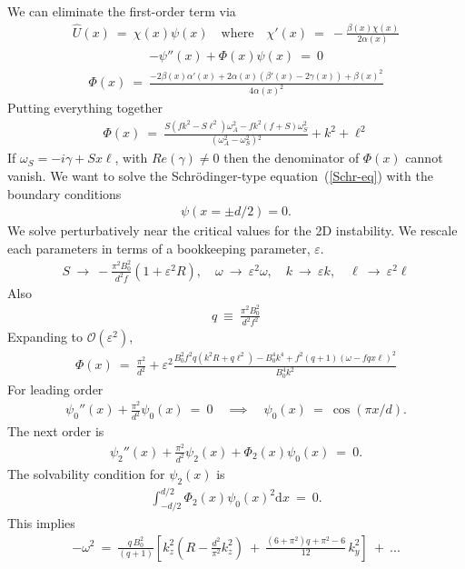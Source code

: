 \documentclass[aps,prl,preprint
,superscriptaddress]{revtex4-1}
\newcommand\Beq{\begin{eqnarray}}
\newcommand\Eeq{\end{eqnarray}}
\newcommand{\eps}{\varepsilon}
\begin{document}
We can eliminate the first-order term via
\Beq
\hat{U}(x) \ = \ \chi(x) \psi(x) \quad \text{where} \quad \chi'(x) \  = \ -\frac{\beta (x) \chi (x)}{2 \alpha (x)}
\Eeq
\Beq
-\psi''(x) + \Phi(x) \psi(x) \ = \ 0 \label{Schr-eq}
\Eeq
\Beq
\Phi(x)  \ = \ \frac{-2 \beta (x) \alpha '(x)+2 \alpha (x)
   \left(\beta '(x)-2 \gamma (x)\right)+\beta
   (x)^2}{4 \alpha (x)^2}
\Eeq
Putting everything together 
\Beq
\Phi(x) \ = \ \frac{S  \left(f k^2-S \ell
   ^2\right) \omega _A^2 -f k^2 (f+S) \omega
   _S^2}{\left(\omega _A^2-\omega
   _S^2\right){}^2} + k^{2} + \ell^{2}
\Eeq
If $\omega_{S}=-i \gamma+Sx\ell$, with $Re(\gamma)\neq0$ then the denominator of $\Phi(x)$ cannot vanish. 
We want to solve the Schr\"{o}dinger-type equation~(\ref{Schr-eq}) with the boundary conditions 
\Beq
\psi(x=\pm d/2) = 0.
\Eeq
We solve perturbatively near the critical values for the 2D  instability. We rescale each parameters in terms of a bookkeeping parameter, $\eps$.
\Beq
S  \ \to \  - \frac{\pi ^2 B_{0}^2}{d^2 f} ( 1 + \eps^{2} R), \quad \omega \ \to \ \eps^{2} \omega , \quad k \ \to \ \eps k, \quad \ell \ \to \ \eps^{2} \ell
\Eeq 
Also 
\Beq
q  \ \equiv  \ \frac{\pi ^2 B_{0}^2}{d^2 f^{2}}
\Eeq
Expanding to $\mathcal{O}(\eps^{2})$, 
\Beq
\Phi(x) \ = \ \frac{\pi^{2}}{d^{2}} + \eps^{2} \frac{B_{0}^2 f^2 q \left(k^2 R+q
   \ell ^2\right) - B_{0}^4 k^4 +f^2 (q+1) (\omega -f q x \ell
   )^2  }{B_{0}^4 k^2}
\Eeq
For leading order 
\Beq
\psi_{0}''(x) + \frac{\pi^{2}}{d^{2}}  \psi_{0}(x) \ = \ 0  \quad \implies \quad \psi_{0}(x) \ = \ \cos(\pi x / d).
\Eeq
The next order is
\Beq
\psi_{2}''(x) + \frac{\pi^{2}}{d^{2}}  \psi_{2}(x) + \Phi_{2}(x)\psi_{0}(x)\ = \ 0.
\Eeq
The solvability condition for $\psi_{2}(x)$ is 
\Beq
\int_{-d/2}^{d/2} \Phi_{2}(x)\psi_{0}(x)^{2} \text{d} x \ = \ 0.
\Eeq
This implies 
\Beq
-\omega^{2} \ = \ \frac{q\,B_{0}^{2}}{(q+1)} \left[ k_z^2 \left(R-\frac{d^2}{\pi^{2}} k_z^2\right) \ + \ \frac{\left(6+\pi ^2\right) q+\pi
   ^2-6}{12 } \, k_{y}^{2}  \right] \ + \ ...
\Eeq
\end{document}
